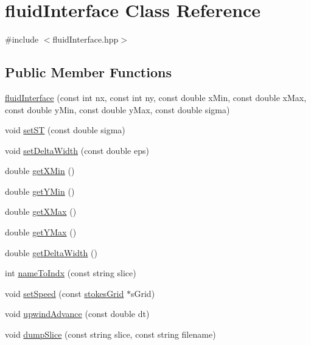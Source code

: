 \hypertarget{classfluidInterface}{}\section{fluid\+Interface Class Reference}
\label{classfluidInterface}


{\ttfamily \#include $<$fluid\+Interface.\+hpp$>$}

\subsection*{Public Member Functions}
\begin{DoxyCompactItemize}
\item 
\hyperlink{classfluidInterface_a14208ac17406c5acad330d80f5440854}{fluid\+Interface} (const int nx, const int ny, const double x\+Min, const double x\+Max, const double y\+Min, const double y\+Max, const double sigma)
\item 
void \hyperlink{classfluidInterface_a838e21b6c55ca2ee2fe726edda5d3aca}{set\+ST} (const double sigma)
\item 
void \hyperlink{classfluidInterface_a05ce87aa6e5aeb08a62067b0122e5956}{set\+Delta\+Width} (const double eps)
\item 
double \hyperlink{classfluidInterface_a34689031ca7a3f5be8a90ee90356f2b7}{get\+X\+Min} ()
\item 
double \hyperlink{classfluidInterface_ae0f8e75e78e169a766fd51f30ef89d06}{get\+Y\+Min} ()
\item 
double \hyperlink{classfluidInterface_aed82e13bb4a6e9f3a2a10b446e14d936}{get\+X\+Max} ()
\item 
double \hyperlink{classfluidInterface_a8032c45eaa5da27d5e58481b1712ea8a}{get\+Y\+Max} ()
\item 
double \hyperlink{classfluidInterface_ab23850cf11c459d68af382a95273251a}{get\+Delta\+Width} ()
\item 
int \hyperlink{classfluidInterface_ad524110f1c5af241e357fac2c7321933}{name\+To\+Indx} (const string slice)
\item 
void \hyperlink{classfluidInterface_a0d4ca41c526fb3af9fc2d7da418d4569}{set\+Speed} (const \hyperlink{classstokesGrid}{stokes\+Grid} $\ast$s\+Grid)
\item 
void \hyperlink{classfluidInterface_ac4422637e35d3bd4f0a08c3b641470f5}{upwind\+Advance} (const double dt)
\item 
void \hyperlink{classfluidInterface_a52469cc0c935ce4744e380481ae20dfa}{dump\+Slice} (const string slice, const string filename)

\end{DoxyCompactItemize}
